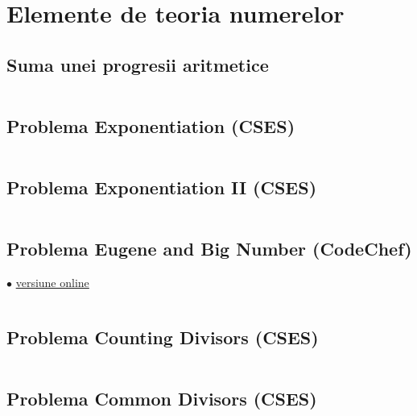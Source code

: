\documentclass[../main.tex]{subfiles}
\begin{document}
\chapter{Elemente de teoria numerelor}

\section{Suma unei progresii aritmetice}
\label{code:progression-sum}

\inputminted{cpp}{../src/math/progression-sum.cpp}

\section{Problema Exponentiation (CSES)}
\label{code:exponentiation}

\inputminted{cpp}{../src/math/exponentiation.cpp}

\section{Problema Exponentiation II (CSES)}
\label{code:exponentiation-2}

\inputminted{cpp}{../src/math/exponentiation-2.cpp}

\section{Problema Eugene and Big Number (CodeChef)}
\label{code:eugene-and-big-number}
$\bullet$
\href{https://www.codechef.com/viewsolution/1095025626}{versiune online}

\inputminted{cpp}{../src/math/eugene-and-big-number.cpp}

\section{Problema Counting Divisors (CSES)}
\label{code:counting-divisors}

\inputminted{cpp}{../src/math/counting-divisors.cpp}

\section{Problema Common Divisors (CSES)}
\label{code:common-divisors}
\end{document}
